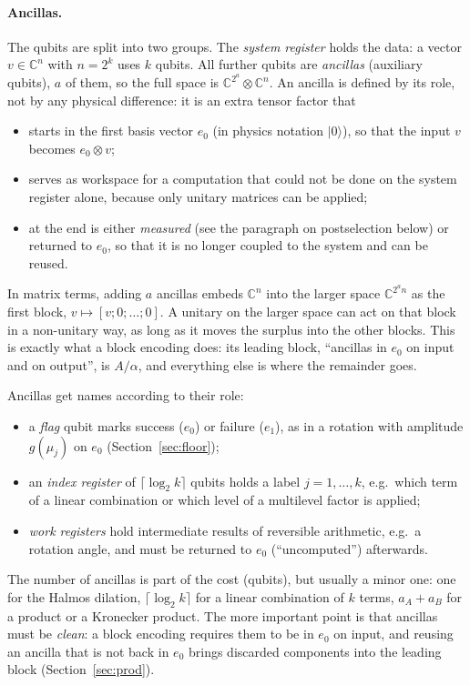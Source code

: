 \documentclass[11pt,a4paper]{article}
\newcommand{\C}{\mathbb{C}}
\begin{document}
\paragraph{Ancillas.} The qubits are split into two groups. The \emph{system
register} holds the data: a vector $v\in\C^n$ with $n=2^k$ uses $k$ qubits. All
further qubits are \emph{ancillas} (auxiliary qubits), $a$ of them, so the full
space is $\C^{2^a}\otimes\C^n$. An ancilla is defined by its role, not by any physical
difference: it is an extra tensor factor that
\begin{itemize}
\item starts in the first basis vector $e_0$ (in physics notation $|0\rangle$),
  so that the input $v$ becomes $e_0\otimes v$;
\item serves as workspace for a computation that could not be done on the
  system register alone, because only unitary matrices can be applied;
\item at the end is either \emph{measured} (see the paragraph on postselection below) or
  returned to $e_0$, so that it is no longer coupled to the system and
  can be reused.
\end{itemize}
In matrix terms, adding $a$ ancillas embeds $\C^n$ into the larger space
$\C^{2^an}$ as the first block, $v\mapsto[v;0;\dots;0]$. A unitary on the larger
space can act on that block in a non-unitary way, as long as it moves the
surplus into the other blocks. This is exactly what a block encoding
does: its leading block, ``ancillas in $e_0$ on input and on output'', is
$A/\alpha$, and everything else is where the remainder goes.

Ancillas get names according to their role:
\begin{itemize}
\item a \emph{flag} qubit marks success ($e_0$) or failure ($e_1$), as in a
  rotation with amplitude $g(\mu_j)$ on $e_0$ (Section~\ref{sec:floor});
\item an \emph{index register} of $\lceil\log_2k\rceil$ qubits holds a label $j=1,\dots,k$,
  e.g.\ which term of a linear combination or which level of a multilevel
  factor is applied;
\item \emph{work registers} hold intermediate results of reversible
  arithmetic, e.g.\ a rotation angle, and must be returned to $e_0$
  (``uncomputed'') afterwards.
\end{itemize}
The number of ancillas is part of the cost (qubits), but usually a minor
one: one for the Halmos dilation, $\lceil\log_2k\rceil$ for a linear combination of
$k$ terms, $a_A+a_B$ for a product or a Kronecker product. The more important
point is that ancillas must be \emph{clean}: a block encoding requires them
to be in $e_0$ on input, and reusing an ancilla that is not back in $e_0$
brings discarded components into the leading block (Section~\ref{sec:prod}).
\end{document}
